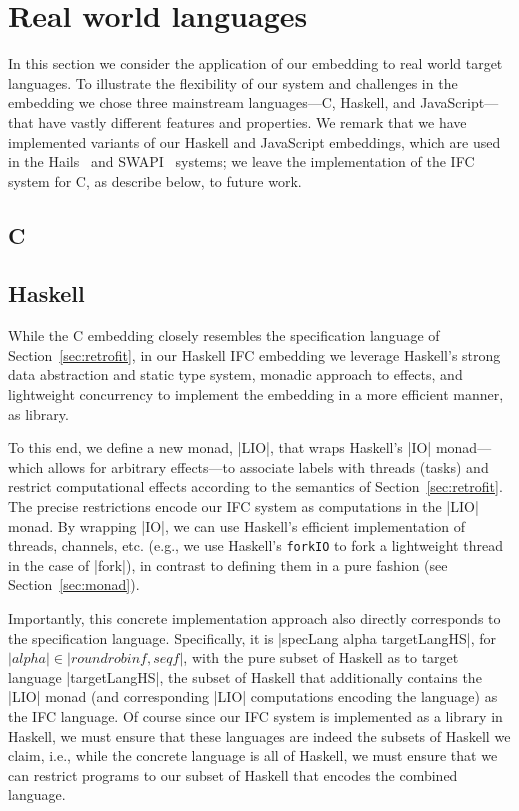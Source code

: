 \section{Real world languages}
\label{sec:real}

In this section we consider the application of our embedding to 
real world target languages.
%
To illustrate the flexibility of our system and challenges in the
embedding we chose three mainstream languages---C, Haskell, and
JavaScript---that have vastly different features and properties.
%
We remark that we have implemented variants of our Haskell and
JavaScript embeddings, which are used in the Hails~\tocite{} and
SWAPI~\tocite{} systems; we leave the implementation of the IFC system
for C, as describe below, to future work.

\subsection{C}
\label{sec:real:c}

\subsection{Haskell}
\label{sec:real:hs}
While the C embedding closely resembles the specification language of
Section~\ref{sec:retrofit}, in our Haskell IFC embedding we leverage
Haskell's strong data abstraction and static type system, monadic
approach to effects, and lightweight concurrency to implement the
embedding in a more efficient manner, as library.

To this end, we define a new monad, |LIO|, that wraps Haskell's |IO|
monad---which allows for arbitrary effects---to associate labels with
threads (tasks) and restrict computational effects according to the
semantics of Section~\ref{sec:retrofit}.
%
The precise restrictions encode our IFC system as computations in the
|LIO| monad.
%
By wrapping |IO|, we can use Haskell's efficient implementation of
threads, channels, etc. (e.g., we use Haskell's \texttt{forkIO} to
fork a lightweight thread in the case of |fork|), in contrast to
defining them in a pure fashion (see Section~\ref{sec:monad}).

Importantly, this concrete implementation approach also directly
corresponds to the specification language.
%
Specifically, it is |specLang alpha targetLangHS|, for $|alpha| \in
|{roundrobinf, seqf}|$, with the pure subset of Haskell as to target
language |targetLangHS|, the subset of Haskell that additionally
contains the |LIO| monad (and corresponding |LIO| computations
encoding the language) as the IFC language.
%
Of course since our IFC system is implemented as a library in Haskell,
we must ensure that these languages are indeed the subsets of Haskell
we claim, i.e., while the concrete language is all of Haskell, we must
ensure that we can restrict programs to our subset of Haskell that
encodes the combined language.
%

